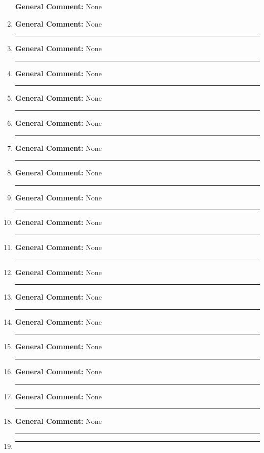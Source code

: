 \documentclass{extbook}[14pt]
\newcommand{\litem}[1]{\item#1\hspace*{-1cm}\rule{\textwidth}{0.4pt}}
\begin{document}
\begin{enumerate}
{\textbf{General Comment:} None
}
\litem{



\textbf{General Comment:} None
}
\litem{



\textbf{General Comment:} None
}
\litem{



\textbf{General Comment:} None
}
\litem{



\textbf{General Comment:} None
}
\litem{



\textbf{General Comment:} None
}
\litem{



\textbf{General Comment:} None
}
\litem{



\textbf{General Comment:} None
}
\litem{



\textbf{General Comment:} None
}
\litem{



\textbf{General Comment:} None
}
\litem{



\textbf{General Comment:} None
}
\litem{



\textbf{General Comment:} None
}
\litem{



\textbf{General Comment:} None
}
\litem{



\textbf{General Comment:} None
}
\litem{



\textbf{General Comment:} None
}
\litem{



\textbf{General Comment:} None
}
\litem{



\textbf{General Comment:} None
}
\litem{



\textbf{General Comment:} None
}
\litem{



}
\end{enumerate}
\end{document}
